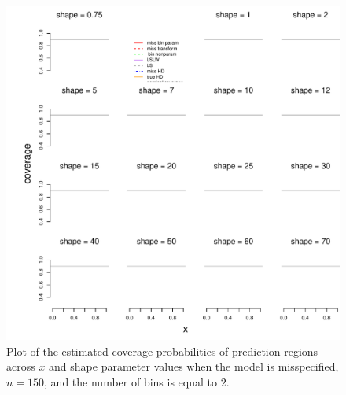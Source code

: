 \documentclass[11pt]{article}\usepackage[]{graphicx}\usepackage[]{color}
\makeatletter
\def\maxwidth{ %
  \ifdim\Gin@nat@width>\linewidth
    \linewidth
  \else
    \Gin@nat@width
  \fi
}
\newenvironment{knitrout}{}{} %
\makeatother
\begin{document}
\newpage
\begin{figure}[h!]
\begin{center}
\begin{knitrout}
\color{fgcolor}
\includegraphics[width=\maxwidth]{figure/Fig-misspec-inx-150-1} 

\end{knitrout}
\end{center}
\caption{Plot of the estimated coverage probabilities of prediction regions 
  across $x$ and shape parameter values when the model is misspecified, 
  $n = 150$, and the number of bins is equal to $2$.}
\label{Fig:misspec.inx.150}
\end{figure}
\end{document}
